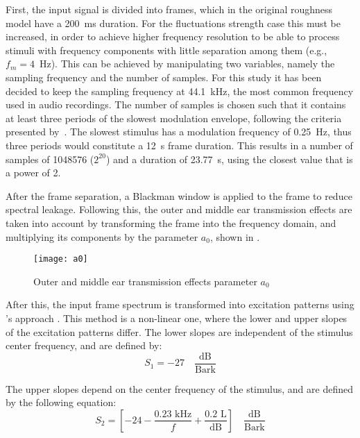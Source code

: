 \documentclass[../main.tex]{subfiles}
\begin{document}
\begin{modelchapter}
First, the input signal is divided into frames, which in the original roughness
model have a 200~ms duration. For the fluctuations strength case this must be
increased, in order to achieve higher frequency resolution to be able to process
stimuli with frequency components with little separation among them (e.g.,
$f_m = 4$~Hz). This can be achieved by manipulating two variables, namely the
sampling frequency and the number of samples. For this study it has been decided
to keep the sampling frequency at 44.1~kHz, the most common frequency used in
audio recordings. The number of samples is chosen such that it contains at least
three periods of the slowest modulation envelope, following the criteria
presented by~\textcite[pp.~97]{Boersma1993}. The slowest stimulus has a
modulation frequency of 0.25~Hz, thus three periods would constitute a 12~s
frame duration. This results in a number of samples of 1048576 ($2^{20}$) and a
duration of 23.77~s, using the closest value that is a power of 2.

After the frame separation, a Blackman window is applied to the frame to reduce
spectral leakage. Following this, the outer and middle ear transmission effects
are taken into account by transforming the frame into the frequency domain, and
multiplying its components by the parameter $a_0$, shown in .

\begin{figure}[!ht]
  \centering
  \texttt{[image: a0]}
  \caption{Outer and middle ear transmission effects parameter $a_0$}
\label{fig:a0}
\end{figure}

After this, the input frame spectrum is transformed into excitation patterns
using \citeauthor{Terhardt1979}'s approach \cite{Terhardt1979}. This method is a
non-linear one, where the lower and upper slopes of the excitation patterns
differ. The lower slopes are independent of the stimulus center frequency, and
are defined by:
\begin{equation}
  S_1 = -27 \quad \frac{\text{dB}}{\text{Bark}}
  \label{eq:lower_slopes}
\end{equation}

The upper slopes depend on the center frequency of the stimulus, and are defined
by the following equation:
\begin{equation}
  S_2 = [-24-\frac{0.23 \text{ kHz}}{f}+\frac{0.2 \text{ L}}{\text{dB}}]
  \quad
  \frac{\text{dB}}{\text{Bark}}
\end{equation}


\end{modelchapter}
\end{document}
